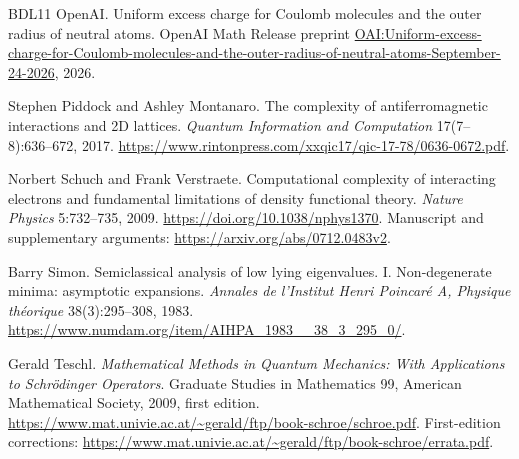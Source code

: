 \begin{thebibliography}{BDL11}
OpenAI.
\newblock Uniform excess charge for Coulomb molecules and the outer
radius of neutral atoms.
\newblock OpenAI Math Release preprint
\href{https://github.com/openai/math/blob/main/preprints/Uniform-excess-charge-for-Coulomb-molecules-and-the-outer-radius-of-neutral-atoms-September-24-2026/paper.pdf}{OAI:Uniform-excess-charge-for-Coulomb-molecules-and-the-outer-radius-of-neutral-atoms-September-24-2026}, 2026.

Stephen Piddock and Ashley Montanaro.
\newblock The complexity of antiferromagnetic interactions and 2D lattices.
\newblock \emph{Quantum Information and Computation} 17(7--8):636--672, 2017.
\newblock \url{https://www.rintonpress.com/xxqic17/qic-17-78/0636-0672.pdf}.

Norbert Schuch and Frank Verstraete.
\newblock Computational complexity of interacting electrons and
fundamental limitations of density functional theory.
\newblock \emph{Nature Physics} 5:732--735, 2009.
\newblock \url{https://doi.org/10.1038/nphys1370}.
\newblock Manuscript and supplementary arguments:
\url{https://arxiv.org/abs/0712.0483v2}.

Barry Simon.
\newblock Semiclassical analysis of low lying eigenvalues. I. Non-degenerate minima:
asymptotic expansions.
\newblock \emph{Annales de l'Institut Henri Poincar\'e A, Physique th\'eorique}
38(3):295--308, 1983.
\newblock \url{https://www.numdam.org/item/AIHPA_1983__38_3_295_0/}.

Gerald Teschl.
\newblock \emph{Mathematical Methods in Quantum Mechanics: With Applications
to Schr\"odinger Operators}.
\newblock Graduate Studies in Mathematics 99, American Mathematical Society,
2009, first edition.
\newblock \url{https://www.mat.univie.ac.at/~gerald/ftp/book-schroe/schroe.pdf}.
\newblock First-edition corrections:
\url{https://www.mat.univie.ac.at/~gerald/ftp/book-schroe/errata.pdf}.

\end{thebibliography}
